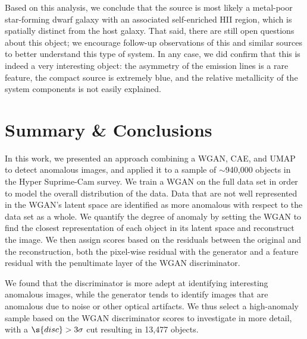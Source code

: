 Based on this analysis, we conclude that the source is most likely a metal-poor star-forming dwarf galaxy with an associated self-enriched HII region, which is spatially distinct from the host galaxy. 
That said, there are still open questions about this object; we encourage follow-up observations of this and similar sources to better understand this type of system.
In any case, we did confirm that this is indeed a very interesting object: the asymmetry of the emission lines is a rare feature, the compact source is extremely blue, and the relative metallicity of the system components is not easily explained.

%


\section{Summary \& Conclusions}
\label{sec:conclusions}

In this work, we presented an approach combining a WGAN, CAE, and UMAP to detect anomalous images, and applied it to a sample of $\sim$940,000 objects in the Hyper Suprime-Cam survey.
We train a WGAN on the full data set in order to model the overall distribution of the data.
Data that are not well represented in the WGAN's latent space are identified as more anomalous with respect to the data set as a whole.
We quantify the degree of anomaly by setting the WGAN to find the closest representation of each object in its latent space and reconstruct the image.
We then assign scores based on the residuals between the original and the reconstruction, both the pixel-wise residual with the generator and a feature residual with the penultimate layer of the WGAN discriminator.

We found that the discriminator is more adept at identifying interesting anomalous images, while the generator tends to identify images that are anomalous due to noise or other optical artifacts.
We thus select a high-anomaly sample based on the WGAN discriminator scores to investigate in more detail, with a $\s{disc}>3\sigma$ cut resulting in 13,477 objects. 

